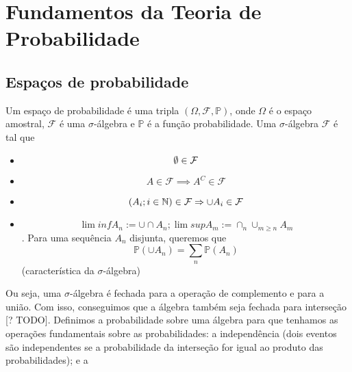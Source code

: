 
\section*{Fundamentos da Teoria de Probabilidade}

\subsection*{Espaços de probabilidade}

Um espaço de probabilidade é uma tripla $\left( \Omega, \mathcal{F}, \mathbb{P} \right) $, onde $\Omega$ é o espaço amostral, $\mathcal{F}$ é uma $\sigma$-álgebra e $ \mathbb{P}$ é a função probabilidade. Uma $\sigma$-álgebra $\mathcal{F}$ é tal que 
\begin{itemize}
    \item  \[
    \emptyset\in \mathcal{F}
    \] 
    \item \[
    A \in \mathcal{F} \implies A^{C} \in \mathcal{F}
    \] 
    \item \[
	    \left( A_i ; i\in \mathbb{N} \right) \in \mathcal{F} \Rightarrow \cup A_i \in  \mathcal{F}
    \] 
    \item \[
	    \lim inf A_n := \cup \cap A_n ; \lim sup A_m := \cap_n \cup_{m\ge n} A_m
    \]. Para uma sequência ${A_n} $ disjunta, queremos que \[
    \mathbb{P}\left( \cup A_n \right) = \sum_{n} \mathbb{P}\left( A_n \right) 
\] (característica da $\sigma$-álgebra)
\end{itemize}

Ou seja, uma $\sigma$-álgebra é fechada para a operação de complemento e para a união. Com isso, conseguimos que a álgebra também seja fechada para interseção [? TODO]. Definimos a probabilidade sobre uma álgebra para que tenhamos as operações fundamentais sobre as probabilidades: a independência (dois eventos são independentes se a probabilidade da interseção for igual ao produto das probabilidades); e a 

